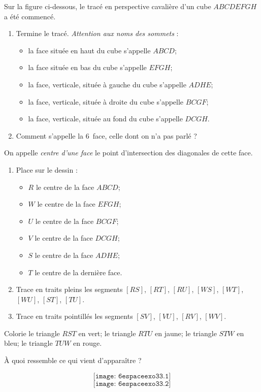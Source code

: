 Sur la figure ci-dessous, le tracé en perspective cavalière d'un cube
$ABCDEFGH$ a été commencé.
\begin{myenumerate}
  \item
    \begin{enumerate}
    \item Termine le tracé. {\em Attention aux noms des sommets} : 
      \begin{itemize}
      \item la face située en haut du cube s'appelle $ABCD$;
      \item la face située en bas du cube s'appelle $EFGH$;
      \item la face, verticale, située à gauche du cube s'appelle $ADHE$;
      \item la face, verticale, située à droite du cube s'appelle $BCGF$;
      \item la face, verticale, située au fond du cube s'appelle $DCGH$.
      \end{itemize}
    \item Comment s'appelle la 6\ieme\ face, celle dont on n'a pas parlé ?
    \end{enumerate}
  \item On appelle {\em centre d'une face} le point d'intersection des
    diagonales de cette face.
    \begin{enumerate}
    \item Place sur le dessin :
      \begin{itemize}
      \item $R$ le centre de la face $ABCD$;
      \item $W$ le centre de la face $EFGH$;
      \item $U$ le centre de la face $BCGF$;
      \item $V$ le centre de la face $DCGH$;
      \item $S$ le centre de la face $ADHE$;
      \item $T$ le centre de la dernière face.
      \end{itemize}
    \item Trace en traits pleins les segments $[RS]$, $[RT]$, $[RU]$,
      $[WS]$, $[WT]$, $[WU]$, $[ST]$, $[TU]$.
    \item Trace en traits pointillés les segments $[SV]$, $[VU]$,
      $[RV]$, $[WV]$.
    \end{enumerate}
  \item Colorie le triangle $RST$ en vert; le triangle $RTU$ en jaune;
    le triangle $STW$ en bleu; le triangle $TUW$ en rouge.
  \item \`A quoi ressemble ce qui vient d'apparaître ?
\end{myenumerate}
\[\texttt{[image: 6espaceexo33.1]}\]
\[\texttt{[image: 6espaceexo33.2]}\]